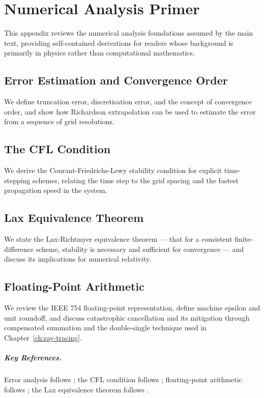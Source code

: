 \chapter{Numerical Analysis Primer}
\label{app:numerical-primer}

This appendix reviews the numerical analysis foundations assumed by the main
text, providing self-contained derivations for readers whose background is
primarily in physics rather than computational mathematics.

\section{Error Estimation and Convergence Order}
\label{sec:num-error}

We define truncation error, discretisation error, and the concept of
convergence order, and show how Richardson extrapolation can be used to
estimate the error from a sequence of grid resolutions.

\section{The CFL Condition}
\label{sec:num-cfl}

We derive the Courant-Friedrichs-Lewy stability condition for explicit
time-stepping schemes, relating the time step to the grid spacing and the
fastest propagation speed in the system.

\section{Lax Equivalence Theorem}
\label{sec:num-lax}

We state the Lax-Richtmyer equivalence theorem --- that for a consistent
finite-difference scheme, stability is necessary and sufficient for
convergence --- and discuss its implications for numerical relativity.

\section{Floating-Point Arithmetic}
\label{sec:num-floating-point}

We review the IEEE 754 floating-point representation, define machine epsilon
and unit roundoff, and discuss catastrophic cancellation and its mitigation
through compensated summation and the double-single technique used in
Chapter~\ref{ch:ray-tracing}.

\paragraph{Key References.}
Error analysis follows \cite{LeVeque2007}; the CFL condition follows
\cite{Courant1928}; floating-point arithmetic follows \cite{Higham2002};
the Lax equivalence theorem follows \cite{Lax1956,Richtmyer1967}.
